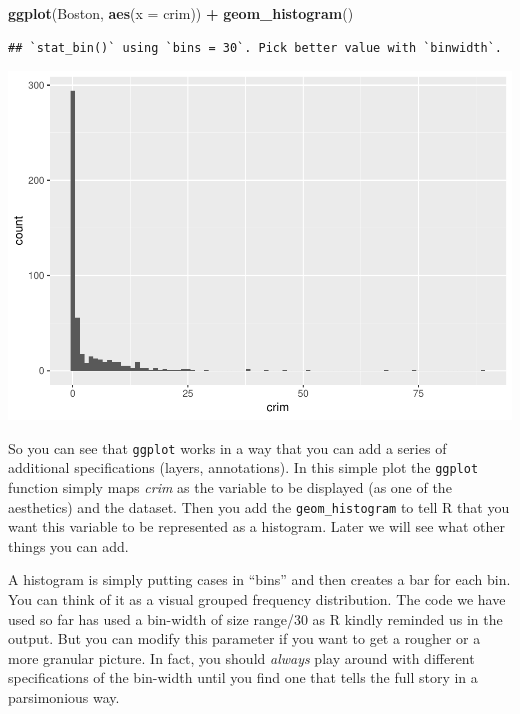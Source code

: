 \documentclass[]{book}
\newenvironment{Shaded}{\begin{snugshade}}{\end{snugshade}}
\newcommand{\DataTypeTok}[1]{\textcolor[rgb]{0.13,0.29,0.53}{#1}}
\newcommand{\KeywordTok}[1]{\textcolor[rgb]{0.13,0.29,0.53}{\textbf{#1}}}
\newcommand{\NormalTok}[1]{#1}
\newcommand{\OperatorTok}[1]{\textcolor[rgb]{0.81,0.36,0.00}{\textbf{#1}}}
\newcommand{\StringTok}[1]{\textcolor[rgb]{0.31,0.60,0.02}{#1}}
\theoremstyle{definition}
\theoremstyle{definition}
\theoremstyle{definition}
\theoremstyle{remark}
\begin{document}
\begin{Shaded}
\begin{Highlighting}[]
\KeywordTok{ggplot}\NormalTok{(Boston, }\KeywordTok{aes}\NormalTok{(}\DataTypeTok{x =}\NormalTok{ crim)) }\OperatorTok{+}\StringTok{ }
\StringTok{  }\KeywordTok{geom_histogram}\NormalTok{()}
\end{Highlighting}
\end{Shaded}

\begin{verbatim}
## `stat_bin()` using `bins = 30`. Pick better value with `binwidth`.
\end{verbatim}

\includegraphics{03-visualisation_files/figure-latex/unnamed-chunk-16-1.pdf}

So you can see that \texttt{ggplot} works in a way that you can add a
series of additional specifications (layers, annotations). In this
simple plot the \texttt{ggplot} function simply maps \emph{crim} as the
variable to be displayed (as one of the aesthetics) and the dataset.
Then you add the \texttt{geom\_histogram} to tell R that you want this
variable to be represented as a histogram. Later we will see what other
things you can add.

A histogram is simply putting cases in ``bins'' and then creates a bar
for each bin. You can think of it as a visual grouped frequency
distribution. The code we have used so far has used a bin-width of size
range/30 as R kindly reminded us in the output. But you can modify this
parameter if you want to get a rougher or a more granular picture. In
fact, you should \emph{always} play around with different specifications
of the bin-width until you find one that tells the full story in a
parsimonious way.
\end{document}
